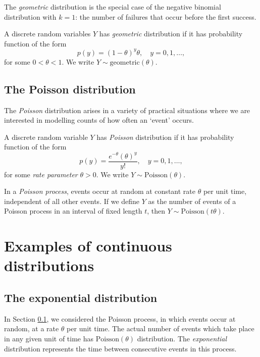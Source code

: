 \documentclass[]{book}
\theoremstyle{definition}
\theoremstyle{definition}
\theoremstyle{definition}
\theoremstyle{remark}
\let\BeginKnitrBlock\begin \let\EndKnitrBlock\end
\begin{document}
The \emph{geometric} distribution is the special case of the negative
binomial distribution with \(k = 1\): the number of failures that occur
before the first success.

\BeginKnitrBlock{definition}
\protect\hypertarget{def:unnamed-chunk-4}{}{\label{def:unnamed-chunk-4} }A
discrete random variables \(Y\) has \emph{geometric} distribution if it
has probability function of the form
\[p(y) = (1 - \theta)^y \theta, \quad
  y = 0, 1, \ldots,
\] for some \(0 < \theta < 1\). We write
\(Y \sim \text{geometric}(\theta)\).
\EndKnitrBlock{definition}

\subsection{The Poisson distribution}\label{poisson}

The \emph{Poisson} distribution arises in a variety of practical
situations where we are interested in modelling counts of how often an
`event' occurs.

\BeginKnitrBlock{definition}
\protect\hypertarget{def:unnamed-chunk-5}{}{\label{def:unnamed-chunk-5} }A
discrete random variable \(Y\) has \emph{Poisson} distribution if it has
probability function of the form
\[p(y) = \frac{e^{-\theta} (\theta)^y}{y!}, \quad y = 0, 1, \ldots,\]
for some \emph{rate parameter} \(\theta > 0\). We write
\(Y \sim \text{Poisson}(\theta)\).
\EndKnitrBlock{definition}

In a \emph{Poisson process}, events occur at random at constant rate
\(\theta\) per unit time, independent of all other events. If we define
\(Y\) as the number of events of a Poisson process in an interval of
fixed length \(t\), then \(Y \sim \text{Poisson}(t \theta)\).

\section{Examples of continuous
distributions}\label{examples-of-continuous-distributions}

\subsection{The exponential
distribution}\label{the-exponential-distribution}

In Section \ref{poisson}, we considered the Poisson process, in which
events occur at random, at a rate \(\theta\) per unit time. The actual
number of events which take place in any given unit of time has
\(\text{Poisson}(\theta)\) distribution. The \emph{exponential}
distribution represents the time between consecutive events in this
process.
\end{document}
